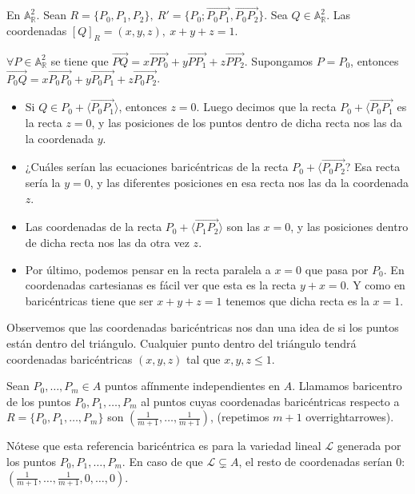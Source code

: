 \documentclass[14pt]{book}
\begin{document}
\begin{ej}
	En $\mathbb{A}_\mathbb{R}^2$. Sean $R = \{P_0, P_1, P_2\},\ R' = \{P_0; \overrightarrow{P_0 P_1}, \overrightarrow{P_0 P_2}\}$. Sea $Q \in \mathbb{A}_\mathbb{R}^2$. Las coordenadas $[Q]_R = (x, y, z),\ x + y + z = 1$.
	
	
	$\forall P \in \mathbb{A}_\mathbb{R}^2$ se tiene que $\overrightarrow{P Q} = x \overrightarrow{P P_0} + y \overrightarrow{P P_1} + z \overrightarrow{P P_2}$. Supongamos $P = P_0$, entonces $\overrightarrow{P_0 Q} = x \overrightarrow{P_0 P_0} + y \overrightarrow{P_0 P_1} + z \overrightarrow{P_0 P_2}$. 
	\begin{itemize}
		\item Si $Q \in P_0 + \langle \overrightarrow{P_0 P_1} \rangle$, entonces $z = 0$. Luego decimos que la recta $P_0 + \langle \overrightarrow{P_0 P_1}$ es la recta $z = 0$, y las posiciones de los puntos dentro de dicha recta nos las da la coordenada $y$.
		\item ¿Cuáles serían las ecuaciones baricéntricas de la recta $P_0 + \langle \overrightarrow{P_0 P_2}$? Esa recta sería la $y = 0$, y las diferentes posiciones en esa recta nos las da la coordenada $z$.
		\item Las coordenadas de la recta $P_0 + \langle \overrightarrow{P_1 P_2}\rangle$ son las $x = 0$, y las posiciones dentro de dicha recta nos las da otra vez $z$.
		\item Por último, podemos pensar en la recta paralela a $x=0$ que pasa por $P_0$. En coordenadas cartesianas es fácil ver que esta es la recta $y + x = 0$. Y como en baricéntricas tiene que ser $x + y + z = 1$ tenemos que dicha recta es la $x = 1$.
	\end{itemize}

	Observemos que las coordenadas baricéntricas nos dan una idea de si los puntos están dentro del triángulo. Cualquier punto dentro del triángulo tendrá coordenadas baricéntricas $(x, y, z)$ tal que $x, y, z \leq 1$.
\end{ej}


\begin{dfn}[Baricentro]
	Sean $P_0, \dots, P_m \in A$ puntos afínmente independientes en $A$. Llamamos baricentro de los puntos $P_0, P_1, \dots, P_m$ al puntos cuyas coordenadas baricéntricas respecto a $R = \{P_0, P_1, \dots, P_m\}$ son $(\frac{1}{m+1}, \dots, \frac{1}{m+1})$, (repetimos $m+1$ overrightarrowes).
	
	Nótese que esta referencia baricéntrica es para la variedad lineal $\mathcal{L}$ generada por los puntos $P_0, P_1, \dots, P_m$. En caso de que $\mathcal{L} \subsetneq A$, el resto de coordenadas serían $0$: $(\frac{1}{m+1}, \dots, \frac{1}{m+1}, 0, \dots, 0)$. 
\end{dfn}
\end{document}
